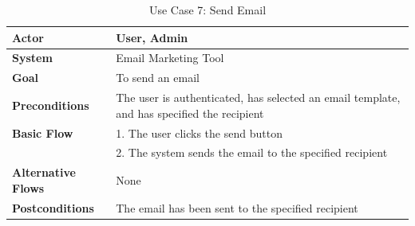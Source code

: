 \begin{table}[ht]
	\centering
	\begin{tabularx}{\textwidth}{|l|X|}
		\hline
		\textbf{Actor}             & User, Admin                                                                                \\
		\hline
		\textbf{System}            & Email Marketing Tool                                                                       \\
		\hline
		\textbf{Goal}              & To send an email                                                                           \\
		\hline
		\textbf{Preconditions}     & The user is authenticated, has selected an email template, and has specified the recipient \\
		\hline
		\textbf{Basic Flow}        & 1. The user clicks the send button                                                         \\
		                           & 2. The system sends the email to the specified recipient                                   \\
		\hline
		\textbf{Alternative Flows} & None                                                                                       \\
		\hline
		\textbf{Postconditions}    & The email has been sent to the specified recipient                                         \\
		\hline
	\end{tabularx}
	\caption{Use Case 7: Send Email}
	\label{tab:Use Case 7 Send Email}
\end{table}
